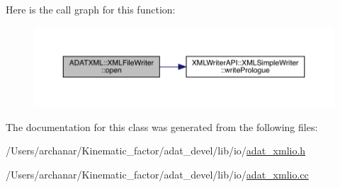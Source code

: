 Here is the call graph for this function\+:
\nopagebreak
\begin{figure}[H]
\begin{center}
\leavevmode
\includegraphics[width=350pt]{d6/ddb/classADATXML_1_1XMLFileWriter_a76f52e7ccdfe3b82875f30953cfd2447_cgraph}
\end{center}
\end{figure}


The documentation for this class was generated from the following files\+:\begin{DoxyCompactItemize}
\item 
/\+Users/archanar/\+Kinematic\+\_\+factor/adat\+\_\+devel/lib/io/\mbox{\hyperlink{lib_2io_2adat__xmlio_8h}{adat\+\_\+xmlio.\+h}}\item 
/\+Users/archanar/\+Kinematic\+\_\+factor/adat\+\_\+devel/lib/io/\mbox{\hyperlink{adat__xmlio_8cc}{adat\+\_\+xmlio.\+cc}}\end{DoxyCompactItemize}
